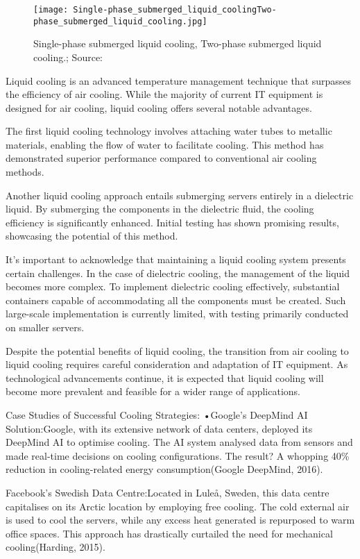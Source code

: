 \documentclass[
  a4paper,  %
  twoside,  %
  bibliography=totoc,
  headsepline,
  cleardoublepage=empty,
  parskip=half,
  draft=false
]{scrbook}
\begin{document}
\begin{figure}
	\centering
	\texttt{[image: Single-phase\_submerged\_liquid\_coolingTwo-phase\_submerged\_liquid\_cooling.jpg]}
	\caption{Single-phase submerged liquid cooling, Two-phase submerged liquid cooling.; Source: \cite{li2023china}}
\end{figure}

Liquid cooling is an advanced temperature management technique that surpasses the efficiency of air cooling. While the majority of current IT equipment is designed for air cooling, liquid cooling offers several notable advantages.

The first liquid cooling technology involves attaching water tubes to metallic materials, enabling the flow of water to facilitate cooling. This method has demonstrated superior performance compared to conventional air cooling methods.

Another liquid cooling approach entails submerging servers entirely in a dielectric liquid. By submerging the components in the dielectric fluid, the cooling efficiency is significantly enhanced. Initial testing has shown promising results, showcasing the potential of this method.

It's important to acknowledge that maintaining a liquid cooling system presents certain challenges. In the case of dielectric cooling, the management of the liquid becomes more complex. To implement dielectric cooling effectively, substantial containers capable of accommodating all the components must be created. Such large-scale implementation is currently limited, with testing primarily conducted on smaller servers.

Despite the potential benefits of liquid cooling, the transition from air cooling to liquid cooling requires careful consideration and adaptation of IT equipment. As technological advancements continue, it is expected that liquid cooling will become more prevalent and feasible for a wider range of applications.


Case Studies of Successful Cooling Strategies:
•Google's  DeepMind  AI  Solution:Google,  with  its  extensive  network  of  data centers, deployed its DeepMind AI to optimise cooling. The AI system analysed data from sensors and  made  real-time  decisions on  cooling  configurations.  The  result?  A  whopping  40\% reduction in cooling-related energy consumption(Google DeepMind, 2016).

Facebook's Swedish Data Centre:Located in Luleå, Sweden, this data centre capitalises on its Arctic location by employing free cooling. The cold external air is used to cool the servers, while any excess heat generated is repurposed to warm office spaces. This approach has drastically curtailed the need for mechanical cooling(Harding, 2015).
\end{document}

